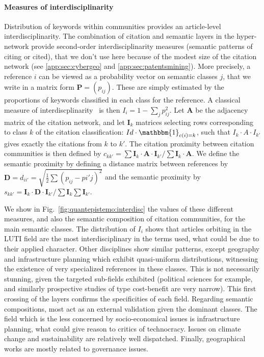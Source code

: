 \documentclass[galley]{jtlu-article-2col}
\begin{document}
\paragraph{Measures of interdisciplinarity}

Distribution of keywords within communities provides an article-level interdisciplinarity. The combination of citation and semantic layers in the hyper-network provide second-order interdisciplinarity measures (semantic patterns of citing or cited), that we don't use here because of the modest size of the citation network (see \ref{app:sec:cybergeo} and \ref{app:sec:patentsmining}). More precisely, a reference $i$ can be viewed as a probability vector on semantic classes $j$, that we write in a matrix form $\mathbf{P}=(p_{ij})$. These are simply estimated by the proportions of keywords classified in each class for the reference. A classical measure of interdiscplinarity~\cite{bergeaud2017classifying} is then $I_i = 1 - \sum_j p_{ij}^2$. Let $\mathbf{A}$ be the adjacency matrix of the citation network, and let $\mathbf{I}_k$ matrices selecting rows corresponding to class $k$ of the citation classification: $Id\cdot \mathbbm{1}_{c(i)=k}$, such that $I_k \cdot A \cdot I_{k'}$ gives exactly the citations from $k$ to $k'$. The citation proximity between citation communities is then defined by $c_{kk'} = \sum \mathbf{I}_k \cdot \mathbf{A} \cdot \mathbf{I}_{k'} /  \sum \mathbf{I}_k \cdot \mathbf{A}$. We define the semantic proximity by defining a distance matrix between references by $\mathbf{D} = d_{ii'}=\sqrt{\frac{1}{2}\sum (p_{ij}-p{i'j})^2}$ and the semantic proximity by $s_{kk'} = \mathbf{I}_k \cdot \mathbf{D} \cdot \mathbf{I}_{k'} / \sum \mathbf{I}_k \sum \mathbf{I}_{k'}$.


We show in Fig.~\ref{fig:quantepistemo:interdisc} the values of these different measures, and also the semantic composition of citation communities, for the main semantic classes. The distribution of $I_i$ shows that articles orbiting in the LUTI field are the most interdisciplinary in the terms used, what could be due to their applied character. Other disciplines show similar patterns, except geography and infrastructure planning which exhibit quasi-uniform distributions, witnessing the existence of very specialized references in these classes. This is not necessarily stunning, given the targeted sub-fields exhibited (political sciences for example, and similarly prospective studies of type cost-benefit are very narrow). This first crossing of the layers confirms the specificities of each field. Regarding semantic compositions, most act as an external validation given the dominant classes. The field which is the less concerned by socio-economical issues is infrastructure planning, what could give reason to critics of technocracy. Issues on climate change and sustainability are relatively well dispatched. Finally, geographical works are mostly related to governance issues.
\end{document}
